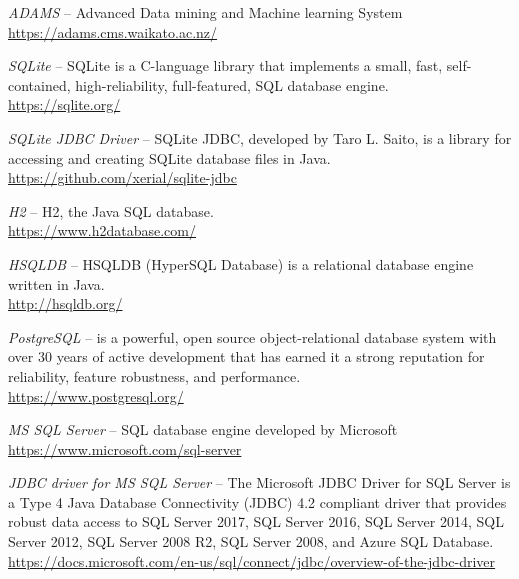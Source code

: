 
\begin{thebibliography}{999}

		\textit{ADAMS} -- Advanced Data mining and Machine learning System \\
		\url{https://adams.cms.waikato.ac.nz/}{}
		
		\textit{SQLite} -- SQLite is a C-language library that implements
		a small, fast, self-contained, high-reliability, full-featured,
		SQL database engine. \\
		\url{https://sqlite.org/}{}

		\textit{SQLite JDBC Driver} -- SQLite JDBC, developed by
		Taro L. Saito, is a library for accessing and creating SQLite
		database files in Java.  \\
		\url{https://github.com/xerial/sqlite-jdbc}{}

		\textit{H2} -- H2, the Java SQL database. \\
		\url{https://www.h2database.com/}{}

		\textit{HSQLDB} -- HSQLDB (HyperSQL Database) is a relational
		database engine written in Java. \\
		\url{http://hsqldb.org/}{}

		\textit{PostgreSQL} --  is a powerful, open source object-relational
		database system with over 30 years of active development that has
		earned it a strong reputation for reliability, feature robustness,
		and performance.  \\
		\url{https://www.postgresql.org/}{}

		\textit{MS SQL Server} -- SQL database engine developed by Microsoft \\
		\url{https://www.microsoft.com/sql-server}{}

		\textit{JDBC driver for MS SQL Server} -- The Microsoft JDBC Driver
		for SQL Server is a Type 4 Java Database Connectivity (JDBC) 4.2
		compliant driver that provides robust data access to SQL Server 2017,
		SQL Server 2016, SQL Server 2014, SQL Server 2012, SQL Server 2008 R2,
		SQL Server 2008, and Azure SQL Database. \\
		\url{https://docs.microsoft.com/en-us/sql/connect/jdbc/overview-of-the-jdbc-driver}{}

\end{thebibliography}
